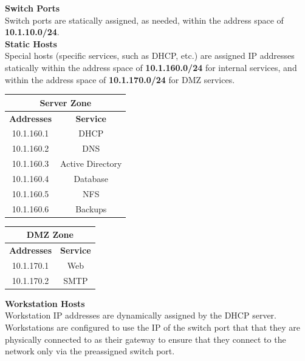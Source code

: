 \noindent
\textbf{Switch Ports} \\
Switch ports are statically assigned, as needed, within the address space of 
\textbf{10.1.10.0/24}. \\

\noindent
\textbf{Static Hosts} \\
Special hosts (specific services, such as DHCP, etc.) are assigned IP addresses 
statically within the address space of \textbf{10.1.160.0/24} for internal 
services, and within the address space of \textbf{10.1.170.0/24} for DMZ 
services. \\

\begin{center}
	\begin{tabular}[m]{| c | c |}
		\hline
		\multicolumn{2}{|c|}{Server Zone}\\
		\hline
		\textbf{Addresses} & \textbf{Service}\\
		\hline
		10.1.160.1 & DHCP \\
		\hline
		10.1.160.2 & DNS \\
		\hline
		10.1.160.3 & Active Directory \\
		\hline
		10.1.160.4 & Database \\
		\hline
		10.1.160.5 & NFS \\
		\hline
		10.1.160.6 & Backups \\
		\hline
	\end{tabular}
\end{center}

\vspace{1em}


\begin{center}
	\begin{tabular}[m]{| c | c |}
		\hline
		\multicolumn{2}{|c|}{DMZ Zone}\\
		\hline
		\textbf{Addresses} & \textbf{Service}\\
		\hline
		10.1.170.1 & Web \\
		\hline
		10.1.170.2 & SMTP \\
		\hline
	\end{tabular}
\end{center}

\vspace{1em}

\noindent
\textbf{Workstation Hosts} \\
Workstation IP addresses are dynamically assigned by the DHCP server. 
Workstations are configured to use the IP of the switch port that that they are
physically connected to as their gateway to ensure that they connect to the 
network only via the preassigned switch port. \\

